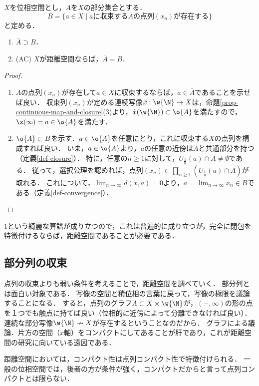 \documentclass[uplatex,dvipdfmx]{jsreport}
\begin{document}
\begin{corollary}[点列による閉包の特徴付け]\label{cor-characterization-of-closure-in-terms-of-limits}
    $X$を位相空間とし，$A$を$X$の部分集合とする．
    \[ B=\{a\in X\mid aに収束するAの点列(x_n)が存在する\} \]
    と定める．
    \begin{enumerate}
        \item $\overline{A}\supset B$．
        \item (AC) $X$が距離空間ならば，$\overline{A}=B$．
    \end{enumerate}
\end{corollary}
\begin{proof}\mbox{}
    \begin{enumerate}
        \item $A$の点列$(x_n)$が存在して$a\in X$に収束するならば，$a\in\overline{A}$であることを示せば良い．
        収束列$(x_n)$が定める連続写像$\tilde{x}:\w{\N}\to X$は，命題\ref{prop-continuous-map-and-closure}(3)より，$\tilde{x}(\w{\N})\subset\o{A}$を満たすので，$\x(\infty)=a\in\o{A}$を満たす．
        \item 
        $\o{A}\subset B$を示す．$a\in\o{A}$を任意にとり，これに収束する$X$の点列を構成すれば良い．
        いま，$a\in\o{A}$より，$a$の任意の近傍は$A$と共通部分を持つ（定義\ref{def-closure}）．
        特に，任意の$n\ge 1$に対して，$U_{\frac{1}{n}}(a)\cap A\ne\emptyset$である．
        従って，選択公理を認めれば，点列$(x_n)\in\prod_{n\ge 1}(U_{\frac{1}{n}}(a)\cap A)$が取れる．
        これについて，$\lim_{n\to\infty}d(x,a)=0$より，$a=\lim_{n\to\infty}x_n\in B$である（定義\ref{def-convergence}）．
    \end{enumerate}
\end{proof}
\begin{remarks}
    1という綺麗な算譜が成り立つので，これは普遍的に成り立つが，完全に閉包を特徴付けるならば，距離空間であることが必要である．
\end{remarks}

\subsection{部分列の収束}

\begin{tcolorbox}[colframe=ForestGreen, colback=ForestGreen!10!white, breakable ,colbacktitle=ForestGreen!40!white, coltitle=black,fonttitle=\bfseries\sffamily
    ,title=部分列という武器：積位相で議論する美しさ]
    点列の収束よりも弱い条件を考えることで，距離空間を調べていく．
    部分列とは面白い対象である．
    写像の空間と積位相の言葉に戻って，写像の極限を議論することになる．
    すると，点列のグラフ$A\subset X\times\w{\N}$が，$(-,\infty)$の形の点を１つでも触点に持てば良い（位相的に近傍によって分離できなければ良い）．
    連続な部分写像$\w{\N}\nrightarrow X$が存在するということなのだから．
    グラフによる議論．片方の空間（$x$軸）をコンパクトにしてあることが肝であり，これが距離空間の研究に向いている遠因である．

    距離空間においては，コンパクト性は点列コンパクト性で特徴付けられる．
    一般の位相空間では，後者の方が条件が強く，コンパクトだからと言って点列コンパクトとは限らない．
\end{tcolorbox}
\end{document}

